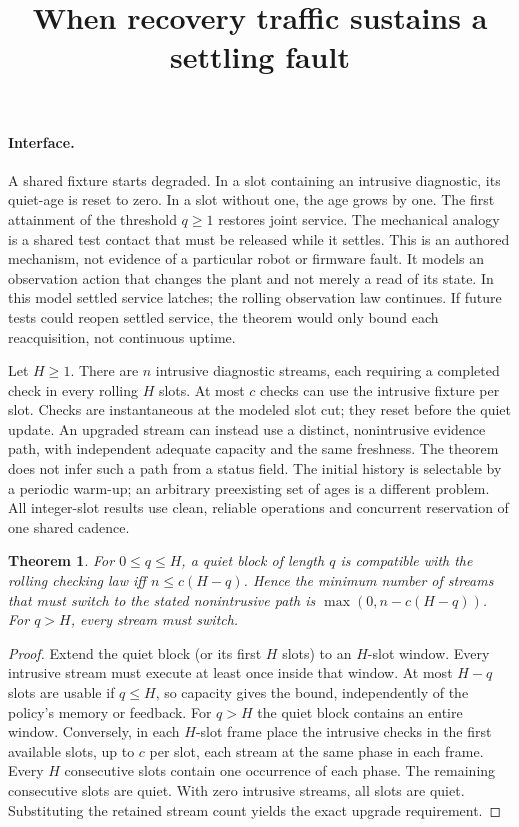 \documentclass{article}
\newtheorem{theorem}{Theorem}
\begin{document}
\title{When recovery traffic sustains a settling fault}
\maketitle

\paragraph{Interface.}
A shared fixture starts degraded. In a slot containing an intrusive diagnostic,
its quiet-age is reset to zero. In a slot without one, the age grows by one.
The first attainment of the threshold $q\ge1$ restores joint service. The
mechanical analogy is a shared test contact that must be released while it
settles. This is an authored mechanism, not evidence of a particular robot or
firmware fault. It models an observation action that changes the plant and
not merely a read of its state. In this model settled service latches; the rolling
observation law continues. If future tests could reopen settled service, the
theorem would only bound each reacquisition, not continuous uptime.

Let $H\ge 1$. There are $n$ intrusive diagnostic streams, each requiring a completed check
in every rolling $H$ slots. At most $c$ checks can use the intrusive fixture per
slot. Checks are instantaneous at the modeled slot cut; they reset before the
quiet update. An upgraded stream can instead use a distinct, nonintrusive
evidence path, with independent adequate capacity and the same freshness.
The theorem does not infer such a path from a status field. The initial
history is selectable by a periodic warm-up; an arbitrary preexisting set of
ages is a different problem. All integer-slot results use clean, reliable
operations and concurrent reservation of one shared cadence.

\begin{theorem}
For $0\le q\le H$, a quiet block of length $q$ is compatible with the
rolling checking law iff $n\le c(H-q)$. Hence the minimum number of streams
that must switch to the stated nonintrusive path is
$\max(0,n-c(H-q))$. For $q>H$, every stream must switch.
\end{theorem}
\begin{proof}
Extend the quiet block (or its first $H$ slots) to an $H$-slot window.
Every intrusive stream must execute at least once inside that window.
At most $H-q$ slots are usable if $q\le H$, so capacity gives the bound,
independently of the policy's memory or feedback. For $q>H$ the quiet
block contains an entire window. Conversely, in each $H$-slot frame place
the intrusive checks in the first available slots, up to $c$ per slot, each
stream at the same phase in each frame. Every $H$ consecutive slots contain
one occurrence of each phase. The remaining consecutive slots are quiet.
With zero intrusive streams, all slots are quiet. Substituting the retained
stream count yields the exact upgrade requirement.
\end{proof}
\end{document}
